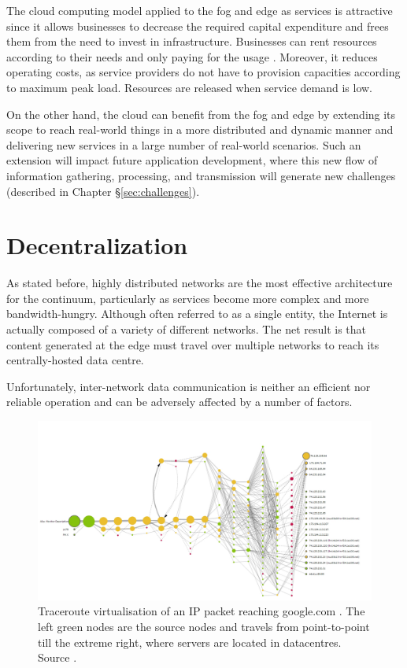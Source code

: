 The cloud computing model applied to the fog and edge as services is attractive since it allows businesses to decrease the required capital expenditure and frees them from the need to invest in infrastructure. Businesses can rent resources according to their needs and only paying for the usage \cite{cloud-iot}. Moreover, it reduces operating costs, as service providers do not have to provision capacities according to maximum peak load. Resources are released when service demand is low.

On the other hand, the cloud can benefit from the fog and edge by extending its scope to reach real-world things in a more distributed and dynamic manner and delivering new services in a large number of real-world scenarios. Such an extension will impact future application development, where this new flow of information gathering, processing, and transmission will generate new challenges (described in Chapter §\ref{sec:challenges}).

\section{Decentralization}

As stated before, highly distributed networks are the most effective architecture for the continuum, particularly as services become more complex and more bandwidth-hungry. Although often referred to as a single entity, the Internet is actually composed of a variety of different networks. The net result is that content generated at the edge must travel over multiple networks to reach its centrally-hosted data centre.

Unfortunately, inter-network data communication is neither an efficient nor reliable operation and can be adversely affected by a number of factors.

\begin{figure}[h]
\centering
\includegraphics[width=\columnwidth]{figures/traceroute}
\caption{Traceroute virtualisation of an IP packet reaching google.com \label{fig:traceroute}. The left green nodes are the source nodes and travels from point-to-point till the extreme right, where servers are located in datacentres. Source \cite{traceroute-google}.}
\end{figure}


